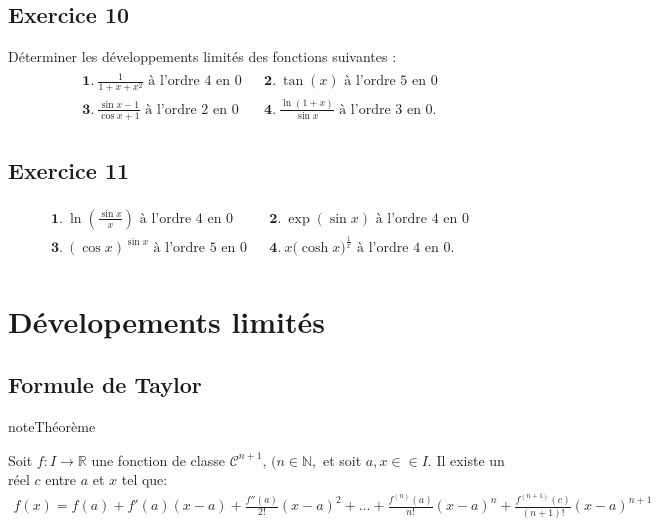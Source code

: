 \documentclass[letterpaper,10pt,french]{jupyterBook}
\begin{document}
\subsection{Exercice 10}
\label{\detokenize{exo6:exercice-10}}
\sphinxAtStartPar
Déterminer les développements limités des fonctions suivantes :
\begin{equation*}
\begin{split}
\begin{array}{lcl}
\displaystyle \mathbf 1.\ \frac{1}{1+x+x^2}\textrm{ à l'ordre 4 en 0}&&\displaystyle \mathbf 2.\ \tan(x)\textrm{ à l'ordre 5 en 0}\\
\displaystyle \mathbf 3.\ \frac{\sin x-1}{\cos x+1}\textrm{ à l'ordre 2 en 0}&&\displaystyle \mathbf 4.\ \frac{\ln(1+x)}{\sin x}\textrm{ à l'ordre 3 en 0}.
\end{array}
\end{split}
\end{equation*}

\subsection{Exercice 11}
\label{\detokenize{exo6:exercice-11}}\begin{equation*}
\begin{split}
\begin{array}{lcl}
\displaystyle \mathbf 1.\ \ln\left(\frac{\sin x}{x}\right)\textrm{ à l'ordre 4 en 0}&&
\displaystyle \mathbf 2.\ \exp(\sin x)\textrm{ à l'ordre 4 en 0}\\
\displaystyle \mathbf 3.\ (\cos x)^{\sin x}\textrm{ à l'ordre 5 en 0}&&
\displaystyle \mathbf 4.\ x\big(\cosh x\big)^{\frac 1x}\textrm{ à l'ordre 4 en 0}.
\end{array}
\end{split}
\end{equation*}

\section{Dévelopements limités}
\label{\detokenize{dl:developements-limites}}\label{\detokenize{dl::doc}}

\subsection{Formule de Taylor}
\label{\detokenize{dl:formule-de-taylor}}
\begin{sphinxadmonition}{note}{Théorème}

\sphinxAtStartPar
Soit \(f : I\rightarrow\mathbb{R}\) une fonction de classe \(\mathscr{C}^{n+1},\,(n\in\mathbb{N},\) et soit \(a, x ∈\in I.\) Il existe un réel \(c\) entre \(a\) et \(x\) tel que:
\begin{equation*}
\begin{split}
f(x)=f(a)+f'(a)(x-a)+\frac{f''(a)}{2!}(x-a)^2+...+\frac{f^{(n)}(a)}{n!}(x-a)^n+\frac{f^{(n+1)}(c)}{(n+1)!}(x-a)^{n+1}
\end{split}
\end{equation*}\end{sphinxadmonition}
\end{document}
